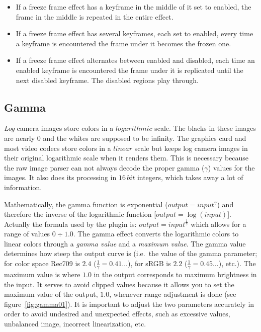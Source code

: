 \begin{itemize}
    \item If a freeze frame effect has a keyframe in the middle of it set to enabled, the frame in the middle is repeated in the entire effect.
    \item If a freeze frame effect has several keyframes, each set to enabled, every time a keyframe is encountered the frame under it becomes the frozen one.
    \item If a freeze frame effect alternates between enabled and disabled, each time an enabled keyframe is encountered the frame under it is replicated until the next disabled keyframe. The disabled regions play through.
\end{itemize}

\subsection{Gamma}%
\label{sub:gamma}

\textit{Log} camera images store colors in a $logarithmic$ scale. The blacks in these images are nearly $0$ and the whites are supposed to be infinity. The graphics card and most video codecs store colors in a $linear$ scale but \CGG{} keeps log camera images in their original logarithmic scale when it renders them. This is necessary because the raw image parser can not always decode the proper gamma ($\gamma$) values for the images. It also does its processing in $16\,bit$ integers, which takes away a lot of information.

Mathematically, the gamma function is exponential
($output = input^{\gamma}$) and therefore the inverse of the
logarithmic function [$output = \log(input)$]. Actually the formula
used by the \CGG{} plugin is: $output = input^{\frac{1}{\gamma}}$
which allows for a range of values $0 \div 1.0$. The gamma effect
converts the logarithmic colors to linear colors through a
\textit{gamma value} and a \textit{maximum value}. The gamma value
determines how steep the output curve is (i.e.\ the value of the
gamma parameter; for color space Rec709 is $2.4$
($\frac{1}{\gamma} =0.41\dots$), for sRGB is $2.2$
($\frac{1}{\gamma} =0.45\dots$), etc.). The maximum value is where
$1.0$ in the output corresponds to maximum brightness in the
input. It serves to avoid clipped values because it allows you to
set the maximum value of the output, $1.0$, whenever range
adjustment is done (see figure~\ref{fig:gamma01}). It is important
to adjust the two parameters accurately in order to avoid undesired
and unexpected effects, such as excessive values, unbalanced image,
incorrect linearization, etc.

